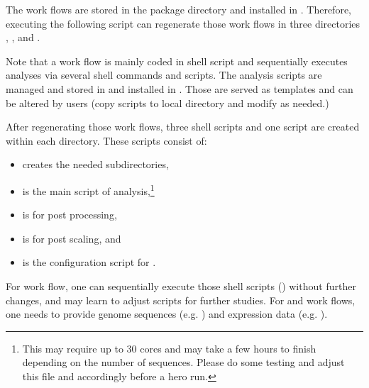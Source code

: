 The work flows are stored in the package directory
 and installed in
. Therefore, executing the
following script can regenerate those work flows in three directories
, ,  and
.
Note that a work flow is mainly coded in shell script and sequentially
executes analyses via several shell commands and  scripts. The
analysis  scripts are managed and stored in
 and installed in
. Those are served as
templates and can be altered by users (copy scripts to local directory
and modify as needed.)

After regenerating those work flows,
three shell scripts and one  script are created
within each directory.  These scripts consist of:
\begin{itemize}
\item {} creates the needed subdirectories,
\item {} is the main script of analysis,\footnote{
This may require up to 30 cores and may take a few hours to finish
depending on the number of sequences. Please do some testing and adjust
this file and  accordingly before a hero run.
}
\item {} is for post processing,
\item {} is for post scaling, and
\item {} is the configuration  script
      for .
\end{itemize}
For  work flow, one can sequentially execute those shell scripts
() without further changes, and may learn to adjust scripts for 
further studies. For  and  work flows, one needs to 
provide genome sequences (e.g. )
and expression data (e.g. ).

